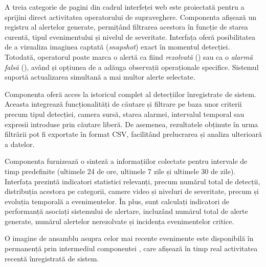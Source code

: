 \documentclass[../../main.tex]{subfiles}
\begin{document}
A treia categorie de pagini din cadrul interfeței web este proiectată pentru a sprijini direct activitatea operatorului de supraveghere. Componenta   afișează un registru al alertelor generate, permițând filtrarea acestora în funcție de starea curentă, tipul evenimentului și nivelul de severitate. Interfața oferă posibilitatea de a vizualiza imaginea captată (\emph{snapshot}) exact în momentul detecției. Totodată, operatorul poate marca o alertă ca fiind \emph{rezolvată} () sau ca o \emph{alarmă falsă} (), având și opțiunea de a adăuga observații operaționale specifice. Sistemul suportă actualizarea simultană a mai multor alerte selectate.

Componenta  oferă acces la istoricul complet al detecțiilor înregistrate de sistem. Aceasta integrează funcționalități de căutare și filtrare pe baza unor criterii precum tipul detecției, camera sursă, starea alarmei, intervalul temporal sau expresii introduse prin căutare liberă. De asemenea, rezultatele obținute în urma filtrării pot fi exportate în format CSV, facilitând prelucrarea și analiza ulterioară a datelor.

Componenta  furnizează o sinteză a informațiilor colectate pentru intervale de timp predefinite (ultimele 24 de ore, ultimele 7 zile și ultimele 30 de zile). Interfața prezintă indicatori statistici relevanți, precum numărul total de detecții, distribuția acestora pe categorii, camere video și niveluri de severitate, precum și evoluția temporală a evenimentelor. În plus, sunt calculați indicatori de performanță asociați sistemului de alertare, incluzând numărul total de alerte generate, numărul alertelor nerezolvate și incidența evenimentelor critice.

O imagine de ansamblu asupra celor mai recente evenimente este disponibilă în permanență prin intermediul componentei , care afișează în timp real activitatea recentă înregistrată de sistem.
\end{document}

